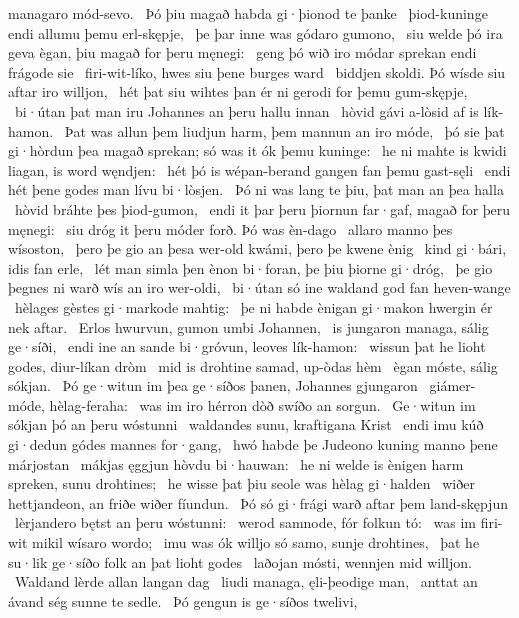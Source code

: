managaro mód-sevo. \hld\ Þó þiu magað habda
gi·þionod te þanke \hld\ þiod-kuninge
endi allumu þemu erl-skępje, \hld\ þe þar inne was
gódaro gumono, \hld\ siu welde þó ira geva ègan,
þiu magað for þeru męnegi: \hld\ geng þó wið iro módar sprekan
endi frágode sie \hld\ firi-wit-líko,
hwes siu þene burges ward \hld\ biddjen skoldi.
Þó wísde siu aftar iro willjon, \hld\ hét þat siu wihtes þan ér
ni gerodi for þemu gum-skępje, \hld\ bi·útan þat man iru Johannes
an þeru hallu innan \hld\ hòvid gávi
a-lòsid af is lík-hamon. \hld\ Þat was allun þem liudjun harm,
þem mannun an iro móde, \hld\ þó sie þat gi·hòrdun þea magað sprekan;
só was it ók þemu kuninge: \hld\ he ni mahte is kwidi liagan,
is word węndjen: \hld\ hét þó is wépan-berand
gangen fan þemu gast-sęli \hld\ endi hét þene godes man
lívu bi·lòsjen. \hld\ Þó ni was lang te þiu,
þat man an þea halla \hld\ hòvid bráhte
þes þiod-gumon, \hld\ endi it þar þeru þiornun far·gaf,
magað for þeru męnegi: \hld\ siu dróg it þeru móder forð.
Þó was èn-dago \hld\ allaro manno
þes wísoston, \hld\ þero þe gio an þesa wer-old kwámi,
þero þe kwene ènig \hld\ kind gi·bári,
idis fan erle, \hld\ lét man simla þen ènon bi·foran,
þe þiu þiorne gi·dróg, \hld\ þe gio þegnes ni warð
wís an iro wer-oldi, \hld\ bi·útan só ine waldand god
fan heven-wange \hld\ hèlages gèstes
gi·markode mahtig: \hld\ þe ni habde ènigan gi·makon hwergin
ér nek aftar. \hld\ Erlos hwurvun,
gumon umbi Johannen, \hld\ is jungaron managa,
sálig ge·síði, \hld\ endi ine an sande bi·gróvun,
leoves lík-hamon: \hld\ wissun þat he lioht godes,
diur-líkan dròm \hld\ mid is drohtine samad,
up-òdas hèm \hld\ ègan móste,
sálig sókjan. \hld\ Þó ge·witun im þea ge·síðos þanen,
Johannes gjungaron \hld\ giámer-móde,
hèlag-feraha: \hld\ was im iro hérron dòð
swíðo an sorgun. \hld\ Ge·witun im sókjan þó
an þeru wóstunni \hld\ waldandes sunu,
kraftigana Krist \hld\ endi imu kúð gi·dedun
gódes mannes for·gang, \hld\ hwó habde þe Judeono kuning
manno þene márjostan \hld\ mákjas ęggjun
hòvdu bi·hauwan: \hld\ he ni welde is ènigen harm spreken,
sunu drohtines; \hld\ he wisse þat þiu seole was
hèlag gi·halden \hld\ wiðer hettjandeon,
an friðe wiðer fíundun. \hld\ Þó só gi·frági warð
aftar þem land-skępjun \hld\ lèrjandero bętst
an þeru wóstunni: \hld\ werod samnode,
fór folkun tó: \hld\ was im firi-wit mikil
wísaro wordo; \hld\ imu was ók willjo só samo,
sunje drohtines, \hld\ þat he su·lik ge·síðo folk
an þat lioht godes \hld\ laðojan mósti,
wennjen mid willjon. \hld\ Waldand lèrde
allan langan dag \hld\ liudi managa,
ęli-þeodige man, \hld\ anttat an ávand ség
sunne te sedle. \hld\ Þó gengun is ge·síðos twelivi,
